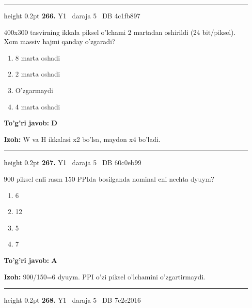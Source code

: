\documentclass[10pt,a4paper,oneside]{article}
\begin{document}
\vspace{2mm}\hrule height 0.2pt \vspace{4mm}
\hypertarget{q266}{\textbf{\color{ink}266.}}  {\color{muted}\scriptsize Y1 \textbullet\ daraja 5 \textbullet\ DB 4c1fb897}
\par
400x300 tasvirning ikkala piksel o'lchami 2 martadan oshirildi (24 bit/piksel). Xom massiv hajmi qanday o'zgaradi?
\begin{enumerate}[label=\Alph*),leftmargin=9mm]
\item 8 marta oshadi
\item 2 marta oshadi
\item O'zgarmaydi
\item 4 marta oshadi
\end{enumerate}
\begin{tcolorbox}[enhanced,breakable,colback=teal!4,colframe=teal!45!black,boxrule=0.45pt,arc=1.2mm,left=2.8mm,right=2.8mm,top=2mm,bottom=2mm,before skip=2mm,after skip=2mm]
\textbf{\color{teal}To'g'ri javob:} \textbf{D}
\par\smallskip
\textbf{Izoh:} W va H ikkalasi x2 bo'lsa, maydon x4 bo'ladi.
\end{tcolorbox}
\vspace{2mm}\hrule height 0.2pt \vspace{4mm}
\hypertarget{q267}{\textbf{\color{ink}267.}}  {\color{muted}\scriptsize Y1 \textbullet\ daraja 5 \textbullet\ DB 60c0eb99}
\par
900 piksel enli rasm 150 PPIda bosilganda nominal eni nechta dyuym?
\begin{enumerate}[label=\Alph*),leftmargin=9mm]
\item 6
\item 12
\item 5
\item 7
\end{enumerate}
\begin{tcolorbox}[enhanced,breakable,colback=teal!4,colframe=teal!45!black,boxrule=0.45pt,arc=1.2mm,left=2.8mm,right=2.8mm,top=2mm,bottom=2mm,before skip=2mm,after skip=2mm]
\textbf{\color{teal}To'g'ri javob:} \textbf{A}
\par\smallskip
\textbf{Izoh:} 900/150=6 dyuym. PPI o'zi piksel o'lchamini o'zgartirmaydi.
\end{tcolorbox}
\vspace{2mm}\hrule height 0.2pt \vspace{4mm}
\hypertarget{q268}{\textbf{\color{ink}268.}}  {\color{muted}\scriptsize Y1 \textbullet\ daraja 5 \textbullet\ DB 7c2c2016}
\end{document}
